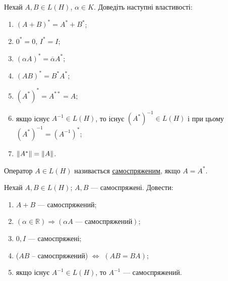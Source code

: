 \begin{exercise}
    Нехай $A, B \in L(H)$, $\alpha \in K$. Доведіть наступні властивості:
    \begin{enumerate}[label=\ukr*)]
        \item $(A+B)^* = A^* + B^*$;
        \item $0^*=0$, $I^* = I$;
        \item $(\alpha A)^* = \overline{\alpha}A^*$;
        \item $(AB)^{*} = B^{*} A^{*}$;
        \item $(A^*)^* = A^{**} = A$;
        \item якщо існує $A^{-1} \in L(H)$, то існує $(A^*)^{-1} \in 
        L(H)$ і при цьому $(A^*)^{-1} = (A^{-1})^*$;
        \item $\left\lVert A^*\right\rVert = \left\lVert A\right\rVert$.
    \end{enumerate}
\end{exercise}

\begin{theory}
    Оператор $A \in L(H)$ називається \uline{самоспряженим}, якщо 
    $A = A^*$.
\end{theory}

\begin{exercise}
    Нехай $A, B \in L(H)$; $A, B$ --- самоспряжені. Довести:
    \begin{enumerate}[label=\ukr*)]
        \item $A+B$ --- самоспряжений;
        \item $\left(\alpha \in \mathbb{R}\right) \Rightarrow \left(\alpha A \text{ --- самоспряжений}\right)$;
        \item $0, I$ --- самоспряжені;
        \item ($AB$ -- самоспряжений) $\Leftrightarrow$ $(AB = BA)$;
        \item якщо існує $A^{-1} \in L(H)$, то $A^{-1}$ --- 
        самоспряжений.
    \end{enumerate}
\end{exercise}

